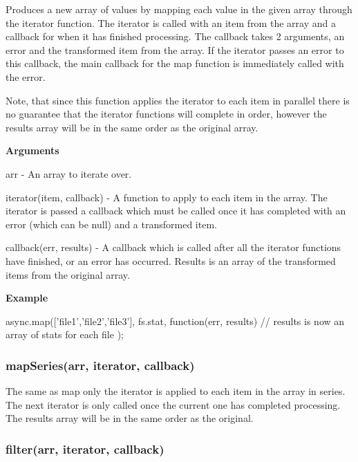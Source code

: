 Produces a new array of values by mapping each value in the given array through the iterator function. The iterator is called with an item from the array and a callback for when it has finished processing. The callback takes 2 arguments, an error and the transformed item from the array. If the iterator passes an error to this callback, the main callback for the map function is immediately called with the error.

Note, that since this function applies the iterator to each item in parallel there is no guarantee that the iterator functions will complete in order, however the results array will be in the same order as the original array.

{\bfseries Arguments}


\begin{DoxyItemize}
\item arr -\/ An array to iterate over.
\item iterator(item, callback) -\/ A function to apply to each item in the array. The iterator is passed a callback which must be called once it has completed with an error (which can be null) and a transformed item.
\item callback(err, results) -\/ A callback which is called after all the iterator functions have finished, or an error has occurred. Results is an array of the transformed items from the original array.
\end{DoxyItemize}

{\bfseries Example} \begin{DoxyVerb}async.map(['file1','file2','file3'], fs.stat, function(err, results){
    // results is now an array of stats for each file
});
\end{DoxyVerb}






\label{_mapSeries}%
 \subsubsection*{map\+Series(arr, iterator, callback)}

The same as map only the iterator is applied to each item in the array in series. The next iterator is only called once the current one has completed processing. The results array will be in the same order as the original.





\label{_filter}%
 \subsubsection*{filter(arr, iterator, callback)}

